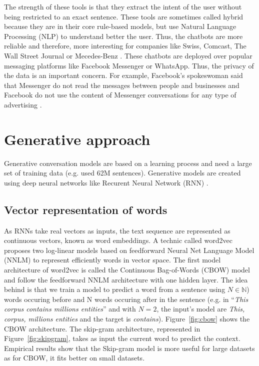 The strength of these tools is that they extract the intent of the user without being restricted to an exact sentence. These tools are sometimes called hybrid because they are in their core rule-based models, but use Natural Language Processing (NLP) to understand better the user. Thus, the chatbots are more reliable and therefore, more interesting for companies like Swiss, Comcast, The Wall Street Journal or Mecedes-Benz \citep{dialogflow}. These chatbots are deployed over popular messaging platforms like Facebook Messenger or WhatsApp. Thus, the privacy of the data is an important concern. For example, Facebook's spokeswoman said that Messenger do not read the messages between people and businesses and Facebook do not use the content of Messenger conversations for any type of advertising \citep{facebook-policy}.

\section{Generative approach}
Generative conversation models are based on a learning process and need a large set of training data (e.g. \citet{1506.05869} used 62M sentences). Generative models are created using deep neural networks like Recurent Neural Network (RNN) \citep{1503.02364,1506.05869}.

\subsection{Vector representation of words}

As RNNs take real vectors as inputs, the text sequence are represented as continuous vectors, known as word embeddings. A technic called word2vec \citep{1301.3781} proposes two log-linear models based on feedforward Neural Net Language Model (NNLM) to represent efficiently words in vector space. The first model architecture of word2vec is called the Continuous Bag-of-Words (CBOW) model and follow the feedforward NNLM architecture with one hidden layer. The idea behind is that we train a model to predict a word from a sentence using $N \in \mathbb{N}$) words occuring before and N words occuring after in the sentence (e.g. in ``\textit{This corpus contains millions entities}'' and with $N=2$, the input's model are \textit{This, corpus, millions entities} and the target is \textit{contains}). Figure~\ref{fig:cbow} shows the CBOW architecture. The skip-gram architecture, represented in Figure~\ref{fig:skipgram}, takes as input the current word to predict the context. Empirical results \citep{tf.word2vec} show that the Skip-gram model is more useful for large datasets as for CBOW, it fits better on small datasets.

